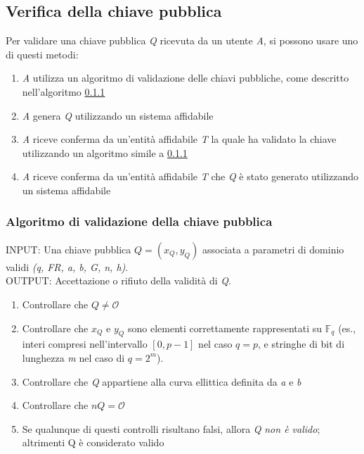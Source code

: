 \documentclass[12pt, a4paper]{report}
\begin{document}
\subsection{Verifica della chiave pubblica}

Per validare una chiave pubblica \textit{Q} ricevuta da un utente \textit{A}, si possono usare uno di questi metodi:
\begin{enumerate}
    \item \textit{A} utilizza un algoritmo di validazione delle chiavi pubbliche, come descritto nell'algoritmo \ref{sec:validare_chiave_pubblica}
    \item \textit{A} genera \textit{Q} utilizzando un sistema affidabile
    \item \textit{A} riceve conferma da un'entità affidabile \textit{T} la quale ha validato la chiave utilizzando un algoritmo simile a \ref{sec:validare_chiave_pubblica}
    \item \textit{A} riceve conferma da un'entità affidabile \textit{T} che \textit{Q} è stato generato utilizzando un sistema affidabile
\end{enumerate}

\subsubsection{Algoritmo di validazione della chiave pubblica}
\label{sec:validare_chiave_pubblica}
INPUT: Una chiave pubblica $Q = (x_Q, y_Q)$ associata a parametri di dominio validi \textit{(q, FR, a, b, G, n, h)}.
\\ OUTPUT: Accettazione o rifiuto della validità di \textit{Q}.
\begin{enumerate}
    \item Controllare che $Q \neq \mathcal{O}$
    \item Controllare che $x_Q$ e $y_Q$ sono elementi correttamente rappresentati su $\mathbb{F}_q$ (es., interi compresi nell'intervallo $[0, p - 1]$ nel caso $q = p$, e stringhe di bit di lunghezza \textit{m} nel caso di $q = 2^m$).
        \item Controllare che \textit{Q} appartiene alla curva ellittica definita da \textit{a} e \textit{b}
        \item Controllare che $nQ = \mathcal{O}$
        \item Se qualunque di questi controlli risultano falsi, allora \textit{Q} \textit{non è valido}; altrimenti Q è considerato valido
\end{enumerate}
\end{document}
